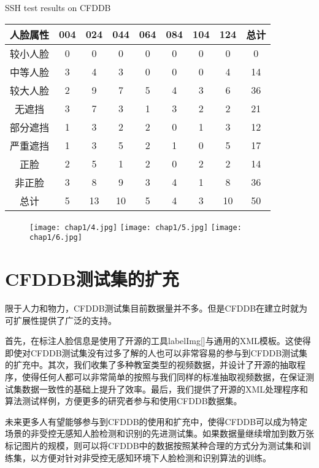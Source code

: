 \begin{table}[!hpb]
	\centering
	{SSH test results on CFDDB}
	\label{tab:cfddbal}
	\begin{tabular}{ c | ccccccc | c }
		\hline
		人脸属性 & 004 & 024 & 044 & 064 & 084 & 104 & 124 & 总计\\
		\hline
		较小人脸 & 0 & 0 & 0 & 0 & 0 & 0 & 0 & 0\\
		中等人脸 & 3 & 4 & 3 & 0 & 0 & 0 & 4 & 14\\
		较大人脸 & 2 & 9 & 7 & 5 & 4 & 3 & 6 & 36\\
		无遮挡   & 3 & 7 & 3 & 1 & 3 & 2 & 2 & 21\\
		部分遮挡 & 1 & 3 & 2 & 2 & 0 & 1 & 3 & 12\\
		严重遮挡 & 1 & 3 & 5 & 2 & 1 & 0 & 5 & 17\\
		正脸     & 2 & 5 & 1 & 2 & 0 & 2 & 2 & 14\\
		非正脸   & 3 & 8 & 9 & 3 & 4 & 1 & 8 & 36\\
		\hline
		总计 & 5 & 13 & 10 & 5 & 4 & 3 & 10 & 50\\
		\hline
	\end{tabular}
\end{table}

\begin{figure}[!htp]
	\centering
	{\texttt{[image: chap1/4.jpg]}}
	\hspace{4em}
	{\texttt{[image: chap1/5.jpg]}}
	\hspace{4em}
	{\texttt{[image: chap1/6.jpg]}}
	\label{fig:cfddbeval}
\end{figure}

\section{CFDDB测试集的扩充}

限于人力和物力，CFDDB测试集目前数据量并不多。但是CFDDB在建立时就为可扩展性提供了广泛的支持。

首先，在标注人脸信息是使用了开源的工具labelImg[]与通用的XML模板。这使得即使对CFDDB测试集没有过多了解的人也可以非常容易的参与到CFDDB测试集的扩充中。其次，我们收集了多种教室类型的视频数据，并设计了开源的抽取程序，使得任何人都可以非常简单的按照与我们同样的标准抽取视频数据，在保证测试集数据一致性的基础上提升了效率。最后，我们提供了开源的XML处理程序和算法测试样例，方便更多的研究者参与和使用CFDDB数据集。

未来更多人有望能够参与到CFDDB的使用和扩充中，使得CFDDB可以成为特定场景的非受控无感知人脸检测和识别的先进测试集。如果数据量继续增加到数万张标记图片的规模，则可以将CFDDB中的数据按照某种合理的方式分为测试集和训练集，以方便对针对非受控无感知环境下人脸检测和识别算法的训练。
